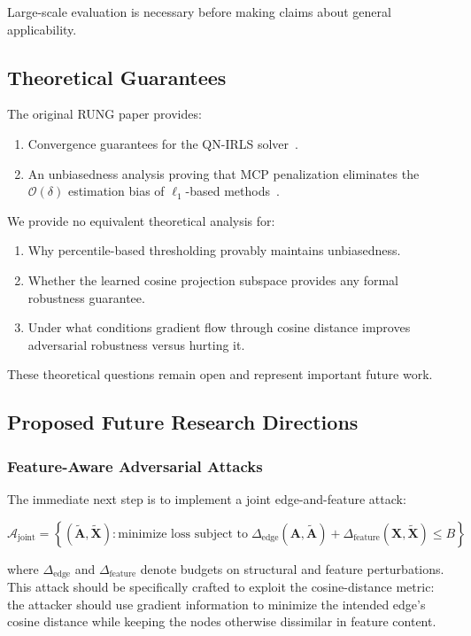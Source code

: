 \documentclass[sigconf]{acmart}
\begin{document}
Large-scale evaluation is necessary before making claims about general applicability.

\subsection{Theoretical Guarantees}

The original RUNG paper provides:
\begin{enumerate}
\item Convergence guarantees for the QN-IRLS solver~\cite{hou2024rung}.
\item An unbiasedness analysis proving that MCP penalization eliminates the $\mathcal{O}(\delta)$ estimation bias of $\ell_1$-based methods~\cite{hou2024rung}.
\end{enumerate}

We provide no equivalent theoretical analysis for:
\begin{enumerate}
\item Why percentile-based thresholding provably maintains unbiasedness.
\item Whether the learned cosine projection subspace provides any formal robustness guarantee.
\item Under what conditions gradient flow through cosine distance improves adversarial robustness versus hurting it.
\end{enumerate}

These theoretical questions remain open and represent important future work.

\subsection{Proposed Future Research Directions}

\subsubsection{Feature-Aware Adversarial Attacks}

The immediate next step is to implement a joint edge-and-feature attack:

$$\mathcal{A}_{\text{joint}} = \left\{ (\tilde{\mathbf{A}}, \tilde{\mathbf{X}}) : \text{minimize loss subject to} \; \Delta_{\text{edge}}(\mathbf{A}, \tilde{\mathbf{A}}) + \Delta_{\text{feature}}(\mathbf{X}, \tilde{\mathbf{X}}) \leq B \right\}$$

where $\Delta_{\text{edge}}$ and $\Delta_{\text{feature}}$ denote budgets on structural and feature perturbations. This attack should be specifically crafted to exploit the cosine-distance metric: the attacker should use gradient information to minimize the intended edge's cosine distance while keeping the nodes otherwise dissimilar in feature content.
\end{document}
